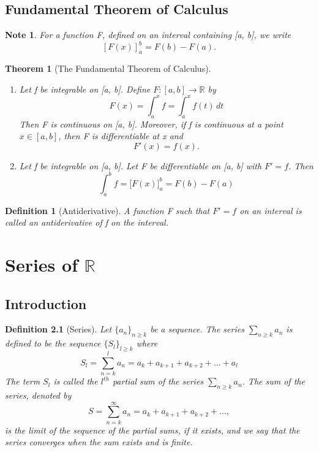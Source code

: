 \documentclass[11pt, oneside]{book}
\theoremstyle{break}
\newtheorem{thm}{Theorem}[section]
\newtheorem*{note}{Note}
\newtheorem{defn}{Definition}[section]
\newcommand{\bb}[1]{\mathbb{#1}}		%
\begin{document}
\section{Fundamental Theorem of Calculus}

\begin{note}
	For a function F, defined on an interval containing [a, b], we write
	\[
		[F(x)]_a^b = F(b) - F(a).
	\]
\end{note}

\begin{thm}[The Fundamental Theorem of Calculus]
	\begin{enumerate}
		\item Let f be integrable on [a, b]. Define $F: [a, b] \to \bb{R}$ by
			\[
				F(x) = \int_{a}^{x} f = \int_{a}^{x} f(t) \, dt
			\]
			Then F is continuous on [a, b]. Moreover, if f is continuous at a point $x \in [a, b]$, then F is differentiable at x and
			\[
				F'(x) = f(x).
			\]
		\item Let f be integrable on [a, b]. Let F be differentiable on [a, b] with $F' = f$. Then
			\[
				\int_{a}^{b} f = \lbrack F(x) \rbrack_a^b = F(b) - F(a)
			\]
	\end{enumerate}
\end{thm}

\begin{defn}[Antiderivative]
	A function F such that $F' = f$ on an interval is called an antiderivative of f on the interval.
\end{defn}


\chapter{Series of \texorpdfstring{$\bb{R}$}{R}}


\section{Introduction}

\begin{defn}[Series]
	Let $\{a_n\}_{n \geq k}$ be a sequence. The series $\sum_{n \geq k} a_n$ is defined to be the sequence $\{S_l\}_{l \geq k}$ where
	\[
		S_l = \sum_{n = k}^{l} a_n = a_k + a_{k + 1} + a_{k + 2} + \hdots + a_l
	\]
	The term $S_l$ is called the $l^{th}$ partial sum of the series $\sum_{n \geq k} a_n$. The sum of the series, denoted by
	\[
		S = \sum_{n = k}^{\infty} a_n = a_k + a_{k + 1} + a_{k + 2} + \hdots ,
	\]
	is the limit of the sequence of the partial sums, if it exists, and we say that the series converges when the sum exists and is finite.
\end{defn}
\end{document}
